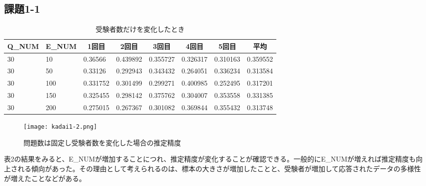 \documentclass[12pt]{jarticle}
\begin{document}
\subsection{課題1-1}
\begin{table}[H]
\centering
\caption{受験者数だけを変化したとき}
\begin{tabular}{ll|lllll|l}
\hline
\multicolumn{1}{c}{Q\_NUM} & \multicolumn{1}{c|}{E\_NUM} & \multicolumn{1}{c}{1回目} & \multicolumn{1}{c}{2回目} & \multicolumn{1}{c}{3回目} & \multicolumn{1}{c}{4回目} & \multicolumn{1}{c|}{5回目} & \multicolumn{1}{c|}{平均} \\ \hline
30                         & 10                          & 0.36566                 & 0.439892                & 0.355727                & 0.326317                & 0.310163                 & 0.359552                \\
30                         & 50                          & 0.33126                 & 0.292943                & 0.343432                & 0.264051                & 0.336234                 & 0.313584                \\
30                         & 100                         & 0.331752                & 0.301499                & 0.299271                & 0.400985                & 0.252495                 & 0.317201                \\
30                         & 150                         & 0.325455                & 0.298142                & 0.375762                & 0.304007                & 0.353558                 & 0.331385                \\
30                         & 200                         & 0.275015                & 0.267367                & 0.301082                & 0.369844                & 0.355432                 & 0.313748                \\ \hline
\end{tabular}
\end{table}
\begin{figure}[H]
 \centering
 \texttt{[image: kadai1-2.png]}
 \caption{問題数は固定し受験者数を変化した場合の推定精度}
\end{figure}
表2の結果をみると、E\_NUMが増加することにつれ、推定精度が変化することが確認できる。一般的にE\_NUMが増えれば推定精度も向上される傾向があった。その理由として考えられるのは、標本の大きさが増加したことと、受験者が増加して応答されたデータの多様性が増えたことなどがある。
\end{document}
